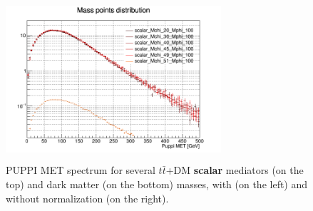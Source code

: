 \documentclass[a4paper, 10pt, openright]{report}
\begin{document}
\begin{figure}[htbp]
{\begin{minipage}[b]{.48\textwidth}
\includegraphics[width=8cm, height=6cm]{figs/scalarMETmChiLarge.png}
\end{minipage} \hfill
}
\caption{\ac{PUPPI} \ac{MET} spectrum for several $t \bar t$+DM \textbf{scalar} mediators (on the top) and dark matter (on the bottom) masses, with (on the left) and without normalization (on the right).}
\label{fig:signalScalar}
\end{figure}
\end{document}
